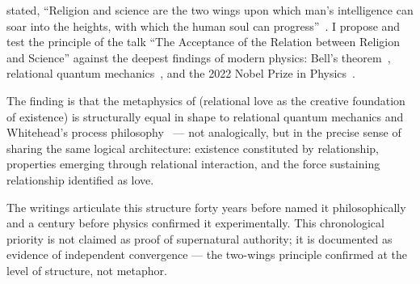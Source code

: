
\AbdulBaha stated, ``Religion and science are the two wings upon which man's intelligence can soar into the heights, with which the human soul can progress''~\citep[p.~143]{ParisTalks}. I propose and test the principle of the talk ``The Acceptance of the Relation between Religion and Science'' against the deepest findings of modern physics: Bell's theorem~\citep{Bell1964}, relational quantum mechanics~\citep{Rovelli1996}, and the 2022 Nobel Prize in Physics~\citep{Zeilinger2023Nobel}.

The finding is that the \bahai metaphysics of \mahabbat (relational love as the creative foundation of existence) is structurally equal in shape to relational quantum mechanics and Whitehead's process philosophy~\citep{Whitehead1929} --- not analogically, but in the precise sense of sharing the same logical architecture: existence constituted by relationship, properties emerging through relational interaction, and the force sustaining relationship identified as love.

The \bahai writings articulate this structure forty years before \citeauthor{Whitehead1929} named it philosophically and a century before physics confirmed it experimentally. This chronological priority is not claimed as proof of supernatural authority; it is documented as evidence of independent convergence --- the two-wings principle confirmed at the level of structure, not metaphor.
